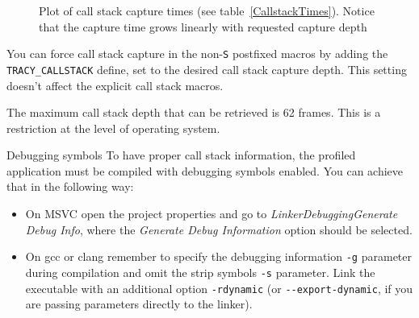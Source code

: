 \documentclass[hidelinks,titlepage,a4paper]{article}
\begin{document}
\begin{figure}[h]
\centering{}
\caption{Plot of call stack capture times (see table~\ref{CallstackTimes}). Notice that the capture time grows linearly with requested capture depth}
\label{CallstackPlot}
\end{figure}

You can force call stack capture in the non-\texttt{S} postfixed macros by adding the \texttt{TRACY\_CALLSTACK} define, set to the desired call stack capture depth. This setting doesn't affect the explicit call stack macros.

The maximum call stack depth that can be retrieved is 62 frames. This is a restriction at the level of operating system.

\begin{bclogo}[
noborder=true,
couleur=black!5,
logo=\bcattention
]{Debugging symbols}
To have proper call stack information, the profiled application must be compiled with debugging symbols enabled. You can achieve that in the following way:

\begin{itemize}
\item On MSVC open the project properties and go to \emph{Linker\textrightarrow Debugging\textrightarrow Generate Debug Info}, where the \emph{Generate Debug Information} option should be selected.
\item On gcc or clang remember to specify the debugging information \texttt{-g} parameter during compilation and omit the strip symbols \texttt{-s} parameter. Link the executable with an additional option \texttt{-rdynamic} (or \texttt{-{}-export-dynamic}, if you are passing parameters directly to the linker).
\end{itemize}
\end{bclogo}
\end{document}
